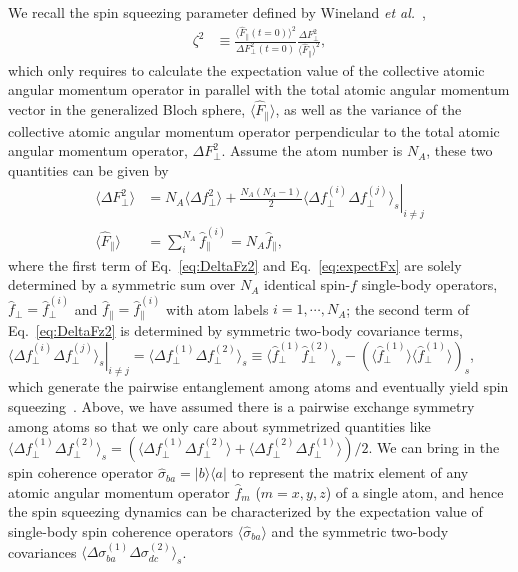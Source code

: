 \documentclass[pra,twocolumn,floatfix,superscriptaddress]{revtex4-1} %
\def\bra#1{\langle{#1}\rvert}%
\def\ket#1{\lvert{#1}\rangle}%
\newcommand{\expect}[1]{\big\langle #1 \big\rangle}
\begin{document}
We recall the spin squeezing parameter defined by Wineland {\emph{et al.}}~\cite{Wineland1992},
\begin{align}
\zeta^2 &\equiv \frac{\expect{\hat{F}_\parallel(t=0)}^2}{\Delta F_\perp^2(t=0)} \frac{\Delta F_\perp^2}{\expect{\hat{F}_\parallel}^2},
\end{align}
which only requires to calculate the expectation value of the collective atomic angular momentum operator in parallel with the total atomic angular momentum vector in the generalized Bloch sphere, $ \expect{\hat{F}_\parallel} $, as well as the variance of the collective atomic angular momentum operator perpendicular to the total atomic angular momentum operator, $ \Delta F_\perp^2 $. 
Assume the atom number is $ N_A $, these two quantities can be given by 
\begin{align}
\expect{\Delta F_\perp^2} &= N_A \expect{\Delta f_\perp^2}+\frac{N_A(N_A-1)}{2}\left. \expect{\Delta f_\perp^{(i)}\Delta f_\perp^{(j)}}_s\right|_{i\neq j}\label{eq:DeltaFz2}\\
\expect{\hat{F}_\parallel } &= \sum_i^{N_A} \hat{f}_\parallel ^{(i)}=N_A \hat{f}_\parallel,\label{eq:expectFx}
\end{align}
where the first term of Eq.~\eqref{eq:DeltaFz2} and Eq.~\eqref{eq:expectFx} are solely determined by a symmetric sum over $N_A$ identical spin-$f$ single-body operators, $ \hat{f}_\perp=\hat{f}_\perp^{(i)} $ and $ \hat{f}_\parallel=\hat{f}_\parallel^{(i)} $ with atom labels $ i=1,\cdots,N_A $; the second term of Eq.~\eqref{eq:DeltaFz2} is determined by symmetric two-body covariance terms, $ \left.\expect{\Delta f_\perp^{(i)}\Delta f_\perp^{(j)}}_s\right|_{i\neq j}=\expect{\Delta f_\perp^{(1)}\Delta f_\perp^{(2)}}_s\equiv \expect{\hat{f}_\perp^{(1)}\hat{f}_\perp^{(2)}}_s-\left( \expect{\hat{f}_\perp^{(1)}} \expect{\hat{f}_\perp^{(1)}}\right)_s $, which generate the pairwise entanglement among atoms and eventually yield spin squeezing~\cite{Wang2003Spin}.
Above, we have assumed there is a pairwise exchange symmetry among atoms so that we only care about symmetrized quantities like $ \expect{\Delta f_\perp^{(1)}\Delta f_\perp^{(2)}}_s=\left(\expect{\Delta f_\perp^{(1)}\Delta f_\perp^{(2)}} + \expect{\Delta f_\perp^{(2)}\Delta f_\perp^{(1)}} \right)/2 $. 
We can bring in the spin coherence operator $\hat{\sigma}_{ba}=\ket{b}\bra{a}$ to represent the matrix element of any atomic angular momentum operator $ \hat{f}_m $ ($ m=x,y,z $) of a single atom, and hence the spin squeezing dynamics can be characterized by the expectation value of single-body spin coherence operators $\expect{\hat{\sigma}_{ba}}$ and the symmetric two-body covariances $\expect{\Delta \sigma_{ba}^{(1)}\Delta\sigma_{dc}^{(2)} }_s$. 
\end{document}
